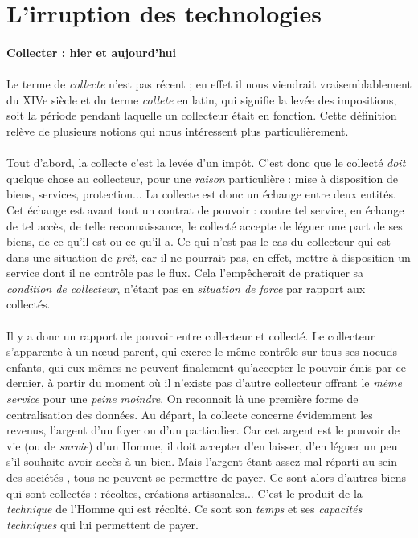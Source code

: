 \section{L'irruption des technologies}

\paragraph{Collecter : hier et aujourd'hui}

\paragraph{} Le terme de \emph{collecte} n'est pas récent ; en effet il nous viendrait vraisemblablement
du XIVe siècle et du terme \emph{collete} en latin, qui signifie la \guillemotleft levée des impositions\guillemotright,
soit la période pendant laquelle un collecteur était en fonction. Cette définition relève de plusieurs notions
qui nous intéressent plus particulièrement.

\paragraph{} Tout d'abord, la collecte c'est la levée d'un impôt. C'est donc que le collecté \emph{doit}
quelque chose au collecteur, pour une \emph{raison} particulière : mise à disposition de biens, services,
protection... La collecte est donc un échange entre deux entités. Cet échange est avant tout un contrat de
pouvoir : contre tel service, en échange de tel accès, de telle reconnaissance, le collecté accepte de
léguer une part de ses biens, de ce qu'il est ou ce qu'il a. Ce qui n'est pas le cas du collecteur qui est
dans une situation de \emph{prêt}, car il ne pourrait pas, en effet, mettre à disposition un service dont
il ne contrôle pas le flux. Cela l'empêcherait de pratiquer sa \emph{condition de collecteur}, n'étant pas en
\emph{situation de force} par rapport aux collectés.

\paragraph{} Il y a donc un rapport de pouvoir entre collecteur et collecté. Le collecteur s'apparente à un n\oe{}ud
parent, qui exerce le même contrôle sur tous ses noeuds enfants, qui eux-mêmes ne peuvent finalement qu'accepter
le pouvoir émis par ce dernier, à partir du moment où il n'existe pas d'autre collecteur offrant le \emph{même
service} pour une \emph{peine moindre}. On reconnait là une première forme de centralisation des données.
Au départ, la collecte concerne évidemment les revenus, l'argent d'un foyer ou d'un particulier. Car cet
argent est le pouvoir de vie (ou de \emph{survie}) d'un Homme, il doit accepter d'en laisser, d'en léguer un peu
s'il souhaite avoir accès à un bien. Mais l'argent étant assez mal réparti au sein des sociétés \cite{Richesses0},
tous ne peuvent se permettre de payer. Ce sont alors d'autres biens qui sont collectés : récoltes, créations
artisanales... C'est le produit de la \emph{technique} de l'Homme qui est récolté. Ce sont son \emph{temps} et
ses \emph{capacités techniques} qui lui permettent de payer.

